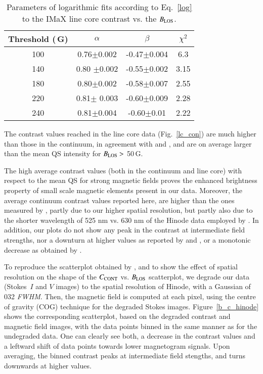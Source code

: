 \documentclass[goettingen, gauss, print]{thesis}
\begin{document}
\begin{table}[h!]
\centering
\begin{tabular}{||cccc||}
\hline
Threshold (\,G) & $\alpha$ &$\beta$ &$\chi^2$ \\
\hline\hline
100 &0.76$\pm$0.002 & -0.47$\pm$0.004 & 6.3 \\
140 & 0.80 $\pm$0.002&-0.55$\pm$0.002&3.15\\
180 & 0.80$\pm$0.002&-0.58$\pm$0.007&2.55\\
220 & 0.81$\pm$ 0.003&-0.60$\pm$0.009&2.28\\
240 & 0.81$\pm$0.004&-0.60$\pm$0.01&2.22\\
\hline
\end{tabular}
\caption{Parameters of logarithmic fits according to Eq.~\ref{log} to the IMaX line core contrast vs. the $B_{\rm LOS}$.}
\label{lc_log}

\end{table}


The contrast values reached in the line core data (Fig.~\ref{lc_con}) are much higher than those in the continuum, in agreement with \cite{title_differences_1992} and \cite{yeo_intensity_2013}, and are on average larger than the mean QS intensity for $B_{\rm LOS}>$ 50\,G. 

The high average contrast values (both in the continuum and line core) with respect to the mean QS for strong magnetic fields proves the enhanced brightness property of small scale magnetic elements present in our data. Moreover, the average continuum contrast values reported here, are higher than the ones measured by \cite{kobel_continuum_2011}, partly due to our higher spatial resolution, but partly also due to the shorter wavelength of 525 nm vs. 630 nm of the Hinode data employed by \cite{kobel_continuum_2011}. In addition, our plots do not show any peak in the contrast at intermediate field strengths, nor a downturn at higher values as reported by \cite{kobel_continuum_2011} and \cite{lawrence_contrast_1993}, or a monotonic decrease as obtained by \cite{topka_properties_1992}.

To reproduce the scatterplot obtained by \cite{kobel_continuum_2011}, and to show the effect of spatial resolution on the shape of the $C_{\rm CONT}$ vs. $B_{\rm LOS}$ scatterplot, we degrade our data (Stokes~$I$ and $V$ images) to the spatial resolution of Hinode,  with a Gaussian of 0\carcsec{}32 \textit{FWHM}. Then, the magnetic field is computed at each pixel, using the centre of gravity (COG) technique \citep{rees_line_1979} for the degraded Stokes images.
Figure~\ref{b_c_hinode} shows the corresponding scatterplot, based on the degraded contrast and magnetic field images, with the data points binned in the same manner as for the undegraded data. One can clearly see both, a decrease in the contrast values and a leftward shift of data points towards lower magnetogram signals. Upon averaging, the binned contrast peaks at intermediate field stengths, and turns downwards at higher values.\\
\end{document}

